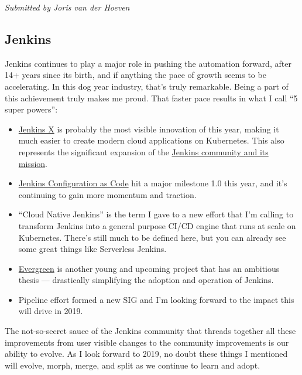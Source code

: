 \documentclass[a4paper]{report}
\begin{document}
{\em Submitted by Joris van der Hoeven}

\subsection{Jenkins}

Jenkins continues to play a major role in pushing the automation
forward, after 14+ years since its birth, and if anything the pace of
growth seems to be accelerating. In this dog year industry, that's truly
remarkable. Being a part of this achievement truly makes me proud. That
faster pace results in what I call ``5 super powers'':

\begin{itemize}

\item \href{https://jenkins-x.io/}{Jenkins X} is probably the most
visible innovation of this year, making it much easier to create modern
cloud applications on Kubernetes. This also represents the significant
expansion of the
\href{https://jenkins.io/blog/2018/03/20/evolving-mission-of-jenkins/}{Jenkins
community and its mission}.

\item \href{https://jenkins.io/projects/jcasc/}{Jenkins Configuration as
Code} hit a major milestone 1.0 this year, and it's continuing to gain
more momentum and traction.

\item ``Cloud Native Jenkins'' is the term I gave to a new effort that
I'm calling to transform Jenkins into a general purpose CI/CD engine that
runs at scale on Kubernetes. There's still much to be defined here, but
you can already see some great things like Serverless Jenkins.

\item \href{https://jenkins.io/projects/evergreen/}{Evergreen} is another
young and upcoming project that has an ambitious thesis --- drastically
simplifying the adoption and operation of Jenkins.

\item Pipeline effort formed a new SIG and I'm looking forward to the
impact this will drive in 2019.

\end{itemize}

The not-so-secret sauce of the Jenkins community that threads together
all these improvements from user visible changes to the community
improvements is our ability to evolve. As I look forward to 2019, no
doubt these things I mentioned will evolve, morph, merge, and split as
we continue to learn and adopt.
\end{document}
